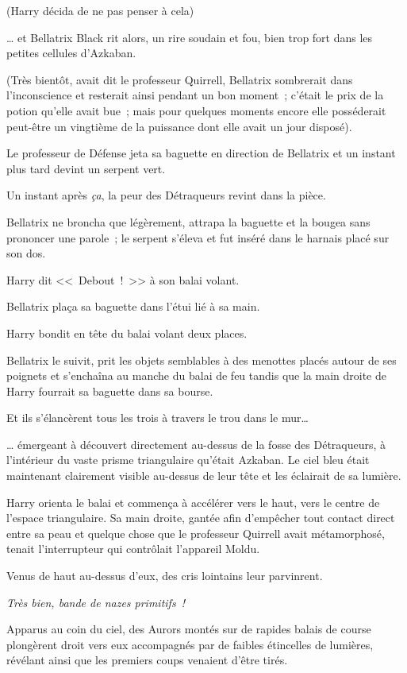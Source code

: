 (Harry décida de ne pas penser à cela)

… et Bellatrix Black rit alors, un rire soudain et fou, bien trop fort dans les petites cellules d'Azkaban.

(Très bientôt, avait dit le professeur Quirrell, Bellatrix sombrerait dans l'inconscience et resterait ainsi pendant un bon moment~; c'était le prix de la potion qu'elle avait bue~; mais pour quelques moments encore elle posséderait peut-être un vingtième de la puissance dont elle avait un jour disposé).

Le professeur de Défense jeta sa baguette en direction de Bellatrix et un instant plus tard devint un serpent vert.

Un instant après \emph{ça}, la peur des Détraqueurs revint dans la pièce.

Bellatrix ne broncha que légèrement, attrapa la baguette et la bougea sans prononcer une parole~; le serpent s'éleva et fut inséré dans le harnais placé sur son dos.

Harry dit <<~Debout~!~>> à son balai volant.

Bellatrix plaça sa baguette dans l'étui lié à sa main.

Harry bondit en tête du balai volant deux places.

Bellatrix le suivit, prit les objets semblables à des menottes placés autour de ses poignets et s'enchaîna au manche du balai de feu tandis que la main droite de Harry fourrait sa baguette dans sa bourse.

Et ils s'élancèrent tous les trois à travers le trou dans le mur…

… émergeant à découvert directement au-dessus de la fosse des Détraqueurs, à l'intérieur du vaste prisme triangulaire qu'était Azkaban. Le ciel bleu était maintenant clairement visible au-dessus de leur tête et les éclairait de sa lumière.

Harry orienta le balai et commença à accélérer vers le haut, vers le centre de l'espace triangulaire. Sa main droite, gantée afin d'empêcher tout contact direct entre sa peau et quelque chose que le professeur Quirrell avait métamorphosé, tenait l'interrupteur qui contrôlait l'appareil Moldu.

Venus de haut au-dessus d'eux, des cris lointains leur parvinrent.

\emph{Très bien, bande de nazes primitifs~!}

Apparus au coin du ciel, des Aurors montés sur de rapides balais de course plongèrent droit vers eux accompagnés par de faibles étincelles de lumières, révélant ainsi que les premiers coups venaient d'être tirés.

